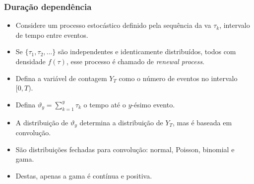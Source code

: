 \documentclass[10pt, aspectratio=169]{beamer}\usepackage[]{graphicx}\usepackage[]{color}
\begin{document}
\begin{frame}
  \frametitle{Duração dependência}
  \begin{itemize}
  \item Considere um processo estocástico definido pela sequência da
    va $\tau_k$, intervalo de tempo entre eventos.
  \item Se $\{\tau_1, \tau_2,\ldots\}$ são independentes e identicamente
    distribuídos, todos com densidade $f(\tau)$, esse processo é chamado
    de \emph{renewal process}.
  \item Defina a variável de contagem $Y_T$ como o número de eventos no
    intervalo $[0,T)$.
  \item Defina $\vartheta_y = \sum_{k=1}^{y} \tau_k$ o tempo até o
    $y$-ésimo evento.
  \item A distribuição de $\vartheta_y$ determina a distribuição de
    $Y_T$, mas é baseada em convolução.
  \item São distribuições fechadas para convolução: normal, Poisson,
    binomial e gama.
  \item Destas, apenas a gama é contínua e positiva.
  \end{itemize}
\end{frame}
\end{document}
